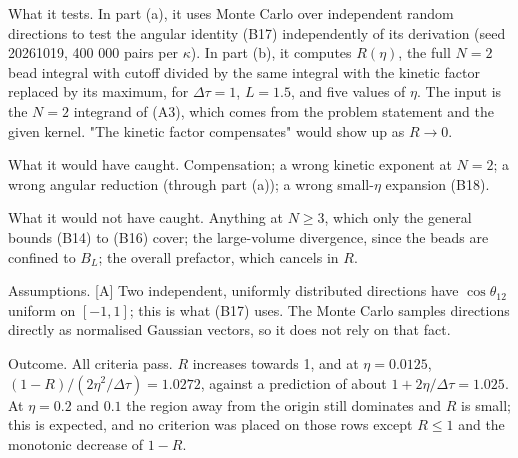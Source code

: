 \documentclass[11pt,a4paper]{article}
\begin{document}
What it tests. In part (a), it uses Monte Carlo over independent random directions to test the angular identity (B17) independently of its derivation (seed 20261019, 400 000 pairs per \(\kappa\)). In part (b), it computes \(R(\eta)\), the full \(N=2\) bead integral with cutoff divided by the same integral with the kinetic factor replaced by its maximum, for \(\Delta\tau=1\), \(L=1.5\), and five values of \(\eta\). The input is the \(N=2\) integrand of (A3), which comes from the problem statement and the given kernel. "The kinetic factor compensates" would show up as \(R\to0\).

What it would have caught. Compensation; a wrong kinetic exponent at \(N=2\); a wrong angular reduction (through part (a)); a wrong small-\(\eta\) expansion (B18).

What it would not have caught. Anything at \(N\ge3\), which only the general bounds (B14) to (B16) cover; the large-volume divergence, since the beads are confined to \(B_L\); the overall prefactor, which cancels in \(R\).

Assumptions. {[}A{]} Two independent, uniformly distributed directions have \(\cos\theta_{12}\) uniform on \([-1,1]\); this is what (B17) uses. The Monte Carlo samples directions directly as normalised Gaussian vectors, so it does not rely on that fact.

Outcome. All criteria pass. \(R\) increases towards 1, and at \(\eta=0.0125\), \((1-R)/(2\eta^2/\Delta\tau)=1.0272\), against a prediction of about \(1+2\eta/\Delta\tau=1.025\). At \(\eta=0.2\) and \(0.1\) the region away from the origin still dominates and \(R\) is small; this is expected, and no criterion was placed on those rows except \(R\le1\) and the monotonic decrease of \(1-R\).
\end{document}
